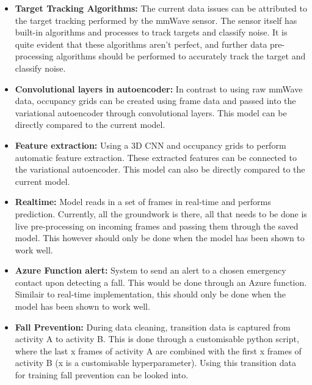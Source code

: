 \begin{itemize}
    \item \textbf{Target Tracking Algorithms:} The current data issues can be attributed to the target tracking performed by the mmWave sensor. The sensor itself has built-in algorithms and processes to track targets and classify noise. It is quite evident that these algorithms aren't perfect, and further data pre-processing algorithms should be performed to accurately track the target and classify noise. 
    \item \textbf{Convolutional layers in autoencoder:} In contrast to using raw mmWave data, occupancy grids can be created using frame data and passed into the variational autoencoder through convolutional layers. This model can be directly compared to the current model.
    \item \textbf{Feature extraction:} Using a 3D CNN and occupancy grids to perform automatic feature extraction. These extracted features can be connected to the variational autoencoder. This model can also be directly compared to the current model.   
    \item \textbf{Realtime:} Model reads in a set of frames in real-time and performs prediction. Currently, all the groundwork is there, all that needs to be done is live pre-processing on incoming frames and passing them through the saved model. This however should only be done when the model has been shown to work well.
    \item \textbf{Azure Function alert:} System to send an alert to a chosen emergency contact upon detecting a fall. This would be done through an Azure function. Similair to real-time implementation, this should only be done when the model has been shown to work well.
    \item \textbf{Fall Prevention:} During data cleaning, transition data is captured from activity A to activity B. This is done through a customisable python script, where the last x frames of activity A are combined with the first x frames of activity B (x is a customisable hyperparameter). Using this transition data for training fall prevention can be looked into.    
\end{itemize}
